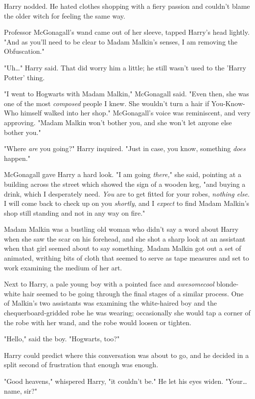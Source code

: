 Harry nodded. He hated clothes shopping with a fiery passion and couldn't blame the older witch for feeling the same way.

Professor McGonagall's wand came out of her sleeve, tapped Harry's head lightly. "And as you'll need to be clear to Madam Malkin's senses, I am removing the Obfuscation."

"Uh{\ldots}" Harry said. That did worry him a little; he still wasn't used to the 'Harry Potter' thing.

"I went to Hogwarts with Madam Malkin," McGonagall said. "Even then, she was one of the most \emph{composed} people I knew. She wouldn't turn a hair if You-Know-Who himself walked into her shop." McGonagall's voice was reminiscent, and very approving. "Madam Malkin won't bother you, and she won't let anyone else bother you."

"Where \emph{are} you going?" Harry inquired. "Just in case, you know, something \emph{does} happen."

McGonagall gave Harry a hard look. "I am going \emph{there,}" she said, pointing at a building across the street which showed the sign of a wooden keg, "and buying a drink, which I desperately need. \emph{You} are to get fitted for your robes, \emph{nothing else}. I will come back to check up on you \emph{shortly}, and I \emph{expect} to find Madam Malkin's shop still standing and not in any way on fire."

Madam Malkin was a bustling old woman who didn't say a word about Harry when she saw the scar on his forehead, and she shot a sharp look at an assistant when that girl seemed about to say something. Madam Malkin got out a set of animated, writhing bits of cloth that seemed to serve as tape measures and set to work examining the medium of her art.

Next to Harry, a pale young boy with a pointed face and \emph{awesomecool} blonde-white hair seemed to be going through the final stages of a similar process. One of Malkin's two assistants was examining the white-haired boy and the chequerboard-gridded robe he was wearing; occasionally she would tap a corner of the robe with her wand, and the robe would loosen or tighten.

"Hello," said the boy. "Hogwarts, too?"

Harry could predict where this conversation was about to go, and he decided in a split second of frustration that enough was enough.

"Good heavens," whispered Harry, "it couldn't be." He let his eyes widen. "Your{\ldots} name, sir?"

